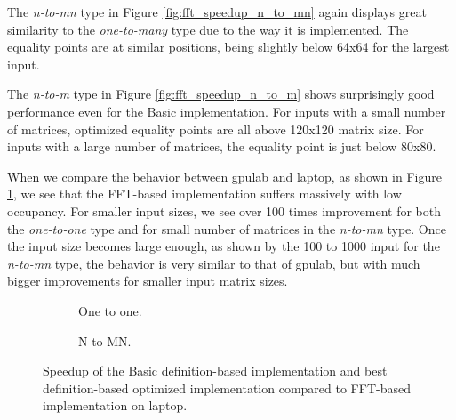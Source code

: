The \textit{n-to-mn} type in Figure \ref{fig:fft_speedup_n_to_mn} again displays great similarity to the \textit{one-to-many} type due to the way it is implemented. The equality points are at similar positions, being slightly below 64x64 for the largest input.

The \textit{n-to-m} type in Figure \ref{fig:fft_speedup_n_to_m} shows surprisingly good performance even for the Basic implementation. For inputs with a small number of matrices, optimized equality points are all above 120x120 matrix size. For inputs with a large number of matrices, the equality point is just below 80x80.


When we compare the behavior between gpulab and laptop, as shown in Figure \ref{fig:fft_speedup_laptop}, we see that the FFT-based implementation suffers massively with low occupancy. For smaller input sizes, we see over 100 times improvement for both the \textit{one-to-one} type and for small number of matrices in the \textit{n-to-mn} type. Once the input size becomes large enough, as shown by the 100 to 1000 input for the \textit{n-to-mn} type, the behavior is very similar to that of gpulab, but with much bigger improvements for smaller input matrix sizes.


\begin{figure}[ht]
	\centering	
	\begin{subfigure}{0.4\textwidth}
		\centering
		\def\svgwidth{\textwidth}
		
		\caption{One to one.}
	\end{subfigure}
	\begin{subfigure}{0.4\textwidth}
		\centering
		\def\svgwidth{\textwidth}
		
		\caption{N to MN.}
	\end{subfigure}
	\caption{Speedup of the Basic definition-based implementation and best definition-based optimized implementation compared to FFT-based implementation on laptop.}
	\label{fig:fft_speedup_laptop}
\end{figure}


